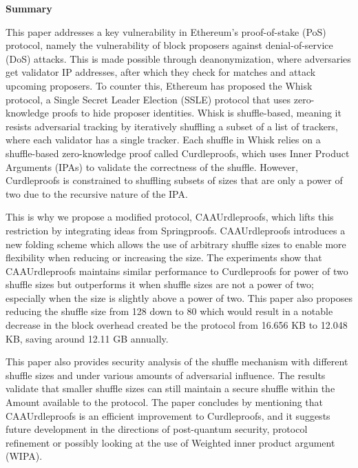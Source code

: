 \onecolumn     %
\thispagestyle{empty}

\begin{center}
    \begin{tcolorbox}[
        width=\dimexpr\paperwidth - 2in\relax,  %
        colback=white,                          %
        colframe=white,                         %
        left=60pt, right=60pt, top=10pt, bottom=10pt, %
        boxrule=0.8pt, %
        fontupper=\large
    ]
        \textbf{\large Summary}%

This paper addresses a key vulnerability in Ethereum’s proof-of-stake (PoS) protocol, namely the vulnerability of block proposers against denial-of-service (DoS) attacks.
This is made possible through deanonymization, where adversaries get validator IP addresses, after which they check for matches and attack upcoming proposers.
To counter this, Ethereum has proposed the Whisk protocol, a Single Secret Leader Election (SSLE) protocol that uses zero-knowledge proofs to hide proposer identities.
Whisk is shuffle-based, meaning it resists adversarial tracking by iteratively shuffling a subset of a list of trackers, where each validator has a single tracker.
Each shuffle in Whisk relies on a shuffle-based zero-knowledge proof called Curdleproofs, which uses Inner Product Arguments (IPAs) to validate the correctness of the shuffle.
However, Curdleproofs is constrained to shuffling subsets of sizes that are only a power of two due to the recursive nature of the IPA.


This is why we propose a modified protocol, CAAUrdleproofs, which lifts this restriction by integrating ideas from Springproofs.
CAAUrdleproofs introduces a new folding scheme which allows the use of arbitrary shuffle sizes to enable more flexibility when reducing or increasing the size.
The experiments show that CAAUrdleproofs maintains similar performance to Curdleproofs for power of two shuffle sizes but outperforms it when shuffle sizes are not a power of two; especially when the size is slightly above a power of two.
This paper also proposes reducing the shuffle size from 128 down to 80 which would result in a notable decrease in the block overhead created be the protocol from 16.656 KB to 12.048 KB, saving around 12.11 GB annually.


This paper also provides security analysis of the shuffle mechanism with different shuffle sizes and under various amounts of adversarial influence.
The results validate that smaller shuffle sizes can still maintain a secure shuffle within the Amount available to the protocol.
The paper concludes by mentioning that CAAUrdleproofs is an efficient improvement to Curdleproofs, and it suggests future development in the directions of post-quantum security, protocol refinement or possibly looking at the use of Weighted inner product argument (WIPA).



        \end{tcolorbox}
    \end{center}